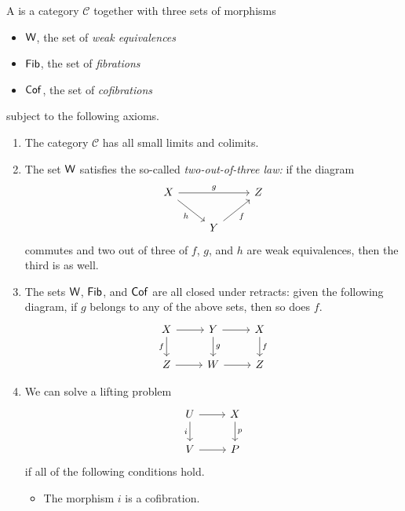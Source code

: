 \documentclass[main.tex]{subfiles}
\begin{document}
\begin{definition}
  \label{def:model_category}
  A  is a category $\mathcal{C}$ together with three sets of morphisms
  \begin{itemize}
    \item $\mathsf{W}$, the set of \emph{weak equivalences}

    \item $\mathsf{Fib}$, the set of \emph{fibrations}

    \item $\mathsf{Cof}$, the set of \emph{cofibrations}
  \end{itemize}
  subject to the following axioms.
  \begin{enumerate}[label=(M\arabic*)]
    \item\label{item:MC_complete_cocomplete} The category $\mathcal{C}$ has all small limits and colimits.

    \item\label{item:MC_two_out_of_three} The set $\mathsf{W}$ satisfies the so-called \emph{two-out-of-three law:} if the diagram
      \begin{equation*}
        \begin{tikzcd}
          X
          \arrow[rr, "g"]
          \arrow[rd, swap, "h"]
          && Z
          \\
          & Y
          \arrow[ur, swap, "f"]
        \end{tikzcd}
      \end{equation*}
      commutes and two out of three of $f$, $g$, and $h$ are weak equivalences, then the third is as well.

    \item\label{item:MC_closed_under_retracts} The sets $\mathsf{W}$, $\mathsf{Fib}$, and $\mathsf{Cof}$ are all closed under retracts: given the following diagram, if $g$ belongs to any of the above sets, then so does $f$.
      \begin{equation*}
        \begin{tikzcd}
          X
          \arrow[r]
          \arrow[d, swap, "f"]
          & Y
          \arrow[r]
          \arrow[d, "g"]
          & X
          \arrow[d, "f"]
          \\
          Z
          \arrow[r]
          & W
          \arrow[r]
          & Z
        \end{tikzcd}
      \end{equation*}

    \item\label{item:MC_solve_some_lifting_problems} We can solve a lifting problem
      \begin{equation*}
        \begin{tikzcd}
          U
          \arrow[r]
          \arrow[d, swap, "i"]
          & X
          \arrow[d, "p"]
          \\
          V
          \arrow[r]
          & P
        \end{tikzcd}
      \end{equation*}
      if all of the following conditions hold.
      \begin{itemize}
        \item The morphism $i$ is a cofibration.


\end{itemize}
\end{enumerate}
\end{definition}
\end{document}

